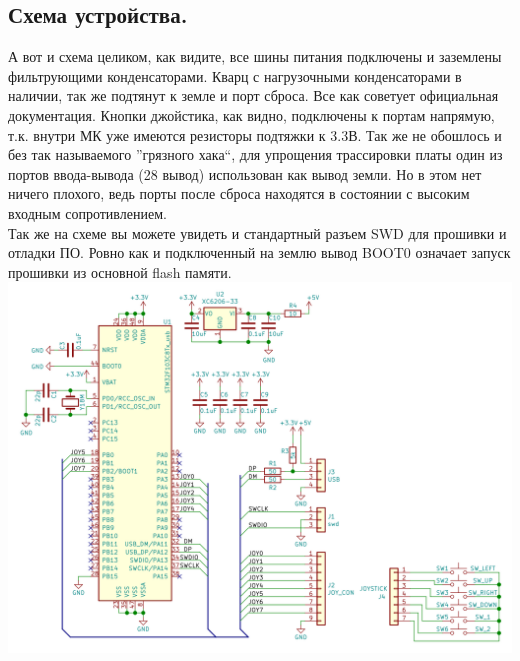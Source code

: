 \documentclass[12pt,a4paper]{article}
\begin{document}
\subsection{Схема устройства.}
    А вот и схема целиком, как видите, все шины питания подключены и
    заземлены фильтрующими конденсаторами. Кварц с нагрузочными конденсаторами
    в наличии, так же подтянут к земле и порт сброса. Все как советует официальная документация.
    Кнопки джойстика, как видно, подключены к портам напрямую, т.к. внутри МК
    уже имеются резисторы подтяжки к 3.3В. Так же не обошлось и без так
    называемого ''грязного хака``, для упрощения трассировки платы один из
    портов ввода-вывода (28 вывод) использован как вывод земли. Но в этом нет ничего плохого,
    ведь порты после сброса находятся в состоянии с высоким входным
    сопротивлением.\\
    Так же на схеме вы можете увидеть и стандартный разъем SWD для прошивки
    и отладки ПО. Ровно как и подключенный на землю вывод BOOT0 означает
    запуск прошивки из основной flash памяти. \\
\includegraphics[width=15cm]{sch.png}\\

\newpage
\end{document}
